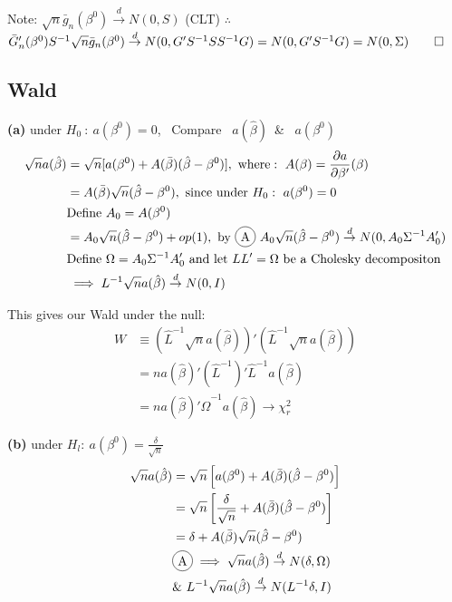 \documentclass[11pt]{article}
\theoremstyle{definition}
\newcommand*\circled[1]{\tikz[baseline=(char.base)]{
            \node[shape=circle,draw,inner sep=2pt] (char) {#1};}}
\def\indist{\stackrel{d}{\rightarrow}}
\def\Ho{$H_{0} \ : \ a(\beta^{0})=0$}
\def\abhat{$a(\hat{\beta})$}
\def\abo{$a(\beta^{0})$}
\begin{document}
Note: $\sqrt{n}\bar{g}_{n}(\beta^{0}) \indist N(0,S)$ (CLT) $\therefore$ \\

$\bar{G}_{n}'(\beta^{0})S^{-1}\sqrt{n}\bar{g}_{n}(\beta^{0}) \indist N(0,G'S^{-1}SS^{-1}G)=N(0,G'S^{-1}G)=N(0,\Sigma) \qed$



\subsection{Wald}
\textbf{(a)} under \Ho, \ Compare \ \abhat \ \& \ \abo  \\ 
\begin{equation*}
\begin{split}
\sqrt{n}a(\hat{\beta}) & =\sqrt{n}[a(\beta^{0})+A(\bar{\beta})(\hat{\beta}-\beta^{0})], \ \text{where}: \ A(\beta)=\frac{\partial a}{\partial \beta'}(\beta) \\
 & = A(\bar{\beta})\sqrt{n}(\hat{\beta}-\beta^{0}), \ \text{since} \ \text{under} \ H_{0}: \ a(\beta^{0})=0 \\
 & \text{Define} \ A_{0}=A(\beta^{0}) \\
 & = A_{0}\sqrt{n}(\hat{\beta}-\beta^{0}) + op(1), \ \text{by} \ \circled{A} \ A_{0}\sqrt{n}(\hat{\beta}-\beta^{0}) 
\indist N(0,A_{0}\Sigma^{-1}A_{0}') \\
 & \text{Define} \ \Omega=A_{0}\Sigma^{-1}A_{0}' \ \text{and let} \ LL'=\Omega \ \text{be a Cholesky decompositon} \\
 & \implies L^{-1}\sqrt{n}a(\hat{\beta}) \indist N(0,I)
\end{split}
\end{equation*}

This gives our Wald under the null:
\begin{equation*}
\begin{split}
W & \equiv \left(\hat{L}^{-1}\sqrt{n}a(\hat{\beta})\right)'\left(\hat{L}^{-1}\sqrt{n}a(\hat{\beta})\right) \\
 & =na(\hat{\beta})'(\hat{L}^{-1})'\hat{L}^{-1}a(\hat{\beta}) \\
 & =na(\hat{\beta})'\hat{\Omega}^{-1}a(\hat{\beta}) \rightarrow \chi^{2}_{r}
\end{split}
\end{equation*}

\noindent
\textbf{(b)} under $H_{l}: \ a(\beta^{0})=\frac{\delta}{\sqrt{n}}$
\begin{equation*}
\begin{split}
\sqrt{n}a(\hat{\beta}) &=\sqrt{n}\left[a(\beta^{0})+A(\bar{\beta})(\hat{\beta}-\beta^{0})\right] \\
 & =\sqrt{n}\left[\frac{\delta}{\sqrt{n}}+A(\bar{\beta})(\hat{\beta}-\beta^{0})\right] \\
 & =\delta+A(\bar{\beta})\sqrt{n}(\hat{\beta}-\beta^{0}) \\
 & \circled{A} \implies \sqrt{n}a(\hat{\beta})\indist N(\delta,\Omega) \\
 & \& \ L^{-1}\sqrt{n}a(\hat{\beta})\indist N(L^{-1}\delta,I)
\end{split}
\end{equation*}
\end{document}
